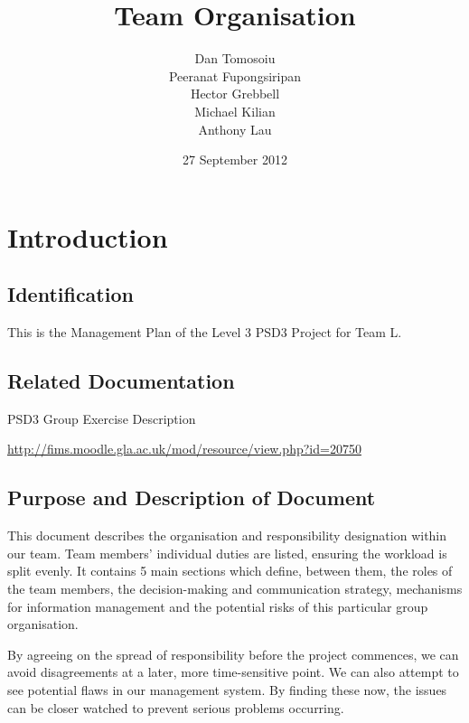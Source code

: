\documentclass{l3deliverable}
\title{Team Organisation}
\author{
  Dan Tomosoiu \\
  Peeranat Fupongsiripan \\
  Hector Grebbell \\
  Michael Kilian \\
  Anthony Lau \\
}
\date{27 September 2012}
\begin{document}

\maketitle


\section{Introduction}

\subsection{Identification}

This is the Management Plan of the Level 3 PSD3 Project for Team L.

\subsection{Related Documentation}

\begin{list}{}{}
\item PSD3 Group Exercise Description \
  
  \url{http://fims.moodle.gla.ac.uk/mod/resource/view.php?id=20750}
\end{list}
 

\subsection{Purpose and Description of Document}
This document describes the organisation and responsibility designation within our team. Team members' individual duties are listed, ensuring the workload is split evenly. It contains 5 main sections which define, between them, the roles of the team members, the decision-making and communication strategy, mechanisms for information management and the potential risks of this particular group organisation. 

By agreeing on the spread of responsibility before the project commences, we can avoid disagreements at a later, more time-sensitive point. We can also attempt to see potential flaws in our management system. By finding these now, the issues can be closer watched to prevent serious problems occurring.
\end{document}
